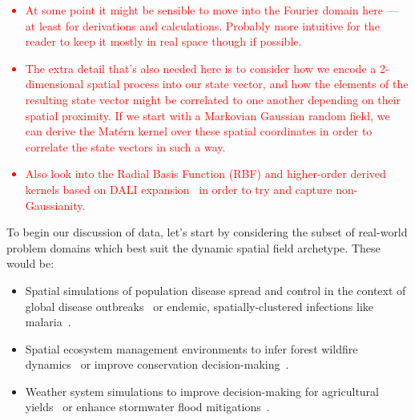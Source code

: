 \textcolor{red}{
\begin{itemize}
\item{At some point it might be sensible to move into the Fourier domain here --- at least for derivations and calculations. Probably more intuitive for the reader to keep it mostly in real space though if possible.} 
\item{The extra detail that's also needed here is to consider how we encode a 2-dimensional spatial process into our state vector, and how the elements of the resulting state vector might be correlated to one another depending on their spatial proximity. If we start with a Markovian Gaussian random field, we can derive the Mat\'{e}rn kernel over these spatial coordinates in order to correlate the state vectors in such a way.} 
\item{Also look into the Radial Basis Function (RBF) and higher-order derived kernels based on DALI expansion~\cite{sellentin2014breaking} in order to try and capture non-Gaussianity.}
\end{itemize}
}

To begin our discussion of data, let's start by considering the subset of real-world problem domains which best suit the dynamic spatial field archetype. These would be:
\begin{itemize}
\item{Spatial simulations of population disease spread and control in the context of global disease outbreaks~\cite{ohi2020exploring} or endemic, spatially-clustered infections like malaria~\cite{carter2000spatial}.}
\item{Spatial ecosystem management environments to infer forest wildfire dynamics~\cite{ganapathi2018using} or improve conservation decision-making~\cite{lapeyrolerie2022deep}.}
\item{Weather system simulations to improve decision-making for agricultural yields~\cite{chen2021reinforcement} or enhance stormwater flood mitigations~\cite{saliba2020deep}.}
\end{itemize}
